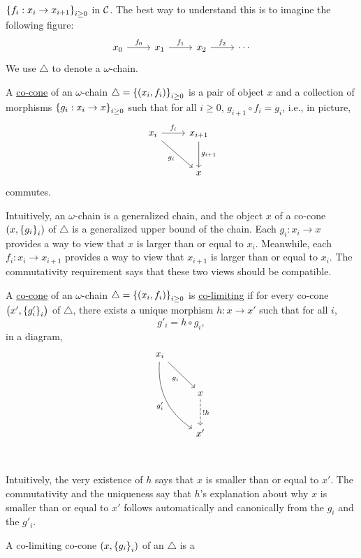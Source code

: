 \begin{enumcirc}
	$\left\{ f_i : x_i \to x_{i+1} \right\}_{i \ge 0}$ in $\mathcal{C}$.
	The best way to understand this is to imagine the following figure:
	\[
		\begin{tikzcd}[row sep=large]
			x_0 \arrow[r, "f_0"] & x_1 \arrow[r, "f_1"] & x_2 \arrow[r, "f_2"] & \cdots
		\end{tikzcd}
	\]
	We use $\triangle$ to denote a $\omega$-chain.
	\item
	A \ul{co-cone} of an $\omega$-chain $\triangle = \left\{ \left( x_i, f_i \right) \right\}_{i
			\ge 0}$ is a pair of object $x$ and a collection of morphisms $\left\{ g_i :
			x_i \to x \right\}_{i \ge 0}$ such that for all $i \ge 0$, $g_{i+1} \circ f_i = g_i$,
	i.e., in picture,
	\[
		\begin{tikzcd}[row sep=large]
			x_i \arrow[r, "f_i"] \arrow[dr, "g_i"'] & x_{i+1} \arrow[d, "g_{i+1}"] \\
			& x
		\end{tikzcd}
	\]
	commutes.
	\item
	Intuitively, an $\omega$-chain is a generalized chain, and the object $x$ of a
	co-cone $\left( x, \left\{ g_i \right\}_i \right)$ of $\triangle$ is a generalized upper bound
	of the chain.
	Each $g_i: x_i \to x$ provides a way to view that $x$ is larger than or equal
	to $x_i$.
	Meanwhile, each $f_i: x_i \to x_{i+1}$ provides a way to view that $x_{i+1}$ is
	larger than or equal to $x_i$.
	The commutativity requirement says that these two views should be compatible.
	\item
	A \ul{co-cone} of an $\omega$-chain $\triangle = \left\{ \left( x_i, f_i \right) \right\}_{i
			\ge 0}$ is \ul{co-limiting} if for every co-cone $\left( x', \left\{ g'_i \right\}_i \right)$
	of $\triangle$, there exists a unique morphism $h: x \to x'$ such that for all
	$i$,
	\[
		g'_i = h \circ g_i,
	\]
	in a diagram,
	\[
		\begin{tikzcd}[row sep=large]
			x_i \arrow[dr, "g_i"'] \arrow[ddr, swap, "g'_i", bend right = 30] & \\
			& x \arrow[d, dashed, "!h"] \\
			& x' \\
		\end{tikzcd}
	\]
	Intuitively, the very existence of $h$ says that $x$ is smaller than or equal
	to $x'$.
	The commutativity and the uniqueness say that $h$'s explanation about why $x$
	is smaller than or equal to $x'$ follows automatically and canonically from the
	$g_i$ and the $g'_i$.
	\item
	A co-limiting co-cone $\left( x, \left\{ g_i \right\}_i \right)$ of an $\triangle$ is a

\end{enumcirc}
